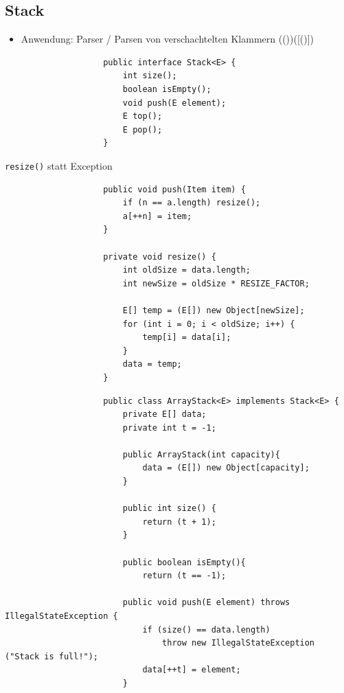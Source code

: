 \documentclass[a4paper, landscape, 8pt]{scrartcl}
\begin{document}
\begin{multicols*}{4}
        \subsection{Stack}
            \begin{itemize}
                \item Anwendung: Parser / Parsen von verschachtelten Klammern (())([()])
            \end{itemize}
            \begin{lstlisting}
                    public interface Stack<E> {
                        int size();
                        boolean isEmpty();
                        void push(E element);
                        E top();
                        E pop();
                    }
            \end{lstlisting}
            \texttt{resize()} statt Exception
            \begin{lstlisting}
                    public void push(Item item) {
                        if (n == a.length) resize();
                        a[++n] = item;
                    }

                    private void resize() {
                        int oldSize = data.length;
                        int newSize = oldSize * RESIZE_FACTOR;

                        E[] temp = (E[]) new Object[newSize];
                        for (int i = 0; i < oldSize; i++) {
                            temp[i] = data[i];
                        }
                        data = temp;
                    }
            \end{lstlisting}
            \begin{lstlisting}
                    public class ArrayStack<E> implements Stack<E> {
                        private E[] data;
                        private int t = -1;

                        public ArrayStack(int capacity){
                            data = (E[]) new Object[capacity];
                        }

                        public int size() {
                            return (t + 1);
                        }

                        public boolean isEmpty(){
                            return (t == -1);

                        public void push(E element) throws IllegalStateException {
                            if (size() == data.length)
                                throw new IllegalStateException ("Stack is full!");
                            data[++t] = element;
                        }


\end{lstlisting}
\end{multicols*}
\end{document}
